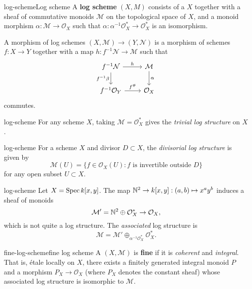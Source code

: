 \begin{topic}{log-scheme}{Log scheme}
    A \textbf{log scheme} $(X, M)$ consists of a  $X$ together with a sheaf of commutative monoids $\mathcal{M}$ on the topological space of $X$, and a monoid morphism $\alpha : \mathcal{M} \to \mathcal{O}_X$ such that $\alpha : \alpha^{-1} \mathcal{O}_X^* \to \mathcal{O}_X^*$ is an isomorphism.
    
    A morphism of log schemes $(X, \mathcal{M}) \to (Y, \mathcal{N})$ is a morphism of schemes $f : X \to Y$ together with a map $h : f^{-1} \mathcal{N} \to \mathcal{M}$ such that
    \[ \begin{tikzcd} f^{-1} \mathcal{N} \arrow{r}{h} \arrow[swap]{d}{f^{-1} \beta} & \mathcal{M} \arrow{d}{\alpha} \\ f^{-1} \mathcal{O}_Y \arrow{r}{f^\#} & \mathcal{O}_X \end{tikzcd} \]
    commutes.
\end{topic}

\begin{example}{log-scheme}
    For any scheme $X$, taking $\mathcal{M} = \mathcal{O}_X^*$ gives the \textit{trivial log structure} on $X$.
\end{example}

\begin{example}{log-scheme}
    For a scheme $X$ and divisor $D \subset X$, the \textit{divisorial log structure} is given by
    \[ \mathcal{M}(U) = \{ f \in \mathcal{O}_X(U) : f \text{ is invertible outside $D$} \} \]
    for any open subset $U \subset X$. 
\end{example}

\begin{example}{log-scheme}
    Let $X = \operatorname{Spec} k[x, y]$. The map $\mathbb{N}^2 \to k[x, y] : (a, b) \mapsto x^a y^b$ induces a sheaf of monoids
    \[ \mathcal{M}' = \mathbb{N}^2 \oplus \mathcal{O}_X^* \to \mathcal{O}_X , \]
    which is not quite a log structure. The \textit{associated} log structure is
    \[ \mathcal{M} = \mathcal{M}' \oplus_{\alpha^{-1} \mathcal{O}_X^*} \mathcal{O}_X^* . \]
\end{example}

\begin{topic}{fine-log-scheme}{fine log scheme}
    A  $(X, \mathcal{M})$ is \textbf{fine} if it is \textit{coherent} and \textit{integral}. That is, étale locally on $X$, there exists a finitely generated integral monoid $P$ and a morphism $P_X \to \mathcal{O}_X$ (where $P_X$ denotes the constant sheaf) whose associated log structure is isomorphic to $\mathcal{M}$.
\end{topic}

